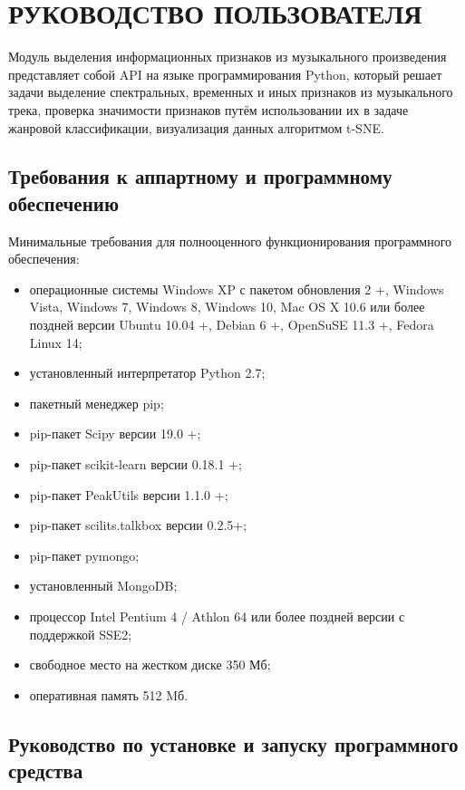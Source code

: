 \section{РУКОВОДСТВО ПОЛЬЗОВАТЕЛЯ}
\label{sec:manual}

Модуль выделения информационных признаков из музыкального произведения представляет собой API на языке программирования Python, который решает задачи выделение спектральных, временных и иных признаков из музыкального трека, проверка значимости признаков путём использовании их в задаче жанровой классификации, визуализация данных алгоритмом t-SNE.


\subsection{Требования к аппартному и программному обеспечению}
\label{sub:manual:sys}

Минимальные требования для полнооценного функционирования программного обеспечения:

\begin{itemize}
\item операционные системы Windows XP с пакетом обновления 2 +, Windows Vista, Windows 7, Windows 8, Windows 10, Mac OS X 10.6 или более поздней версии Ubuntu 10.04 +, Debian 6 +, OpenSuSE 11.3 +, Fedora Linux 14;
\item установленный интерпретатор Python 2.7;
\item пакетный менеджер pip;
\item pip-пакет Scipy версии 19.0 +;
\item pip-пакет scikit-learn версии 0.18.1 +; 
\item pip-пакет PeakUtils  версии 1.1.0 +;
\item pip-пакет scilits.talkbox версии 0.2.5+;
\item pip-пакет pymongo;
\item установленный MongoDB;
\item процессор Intel Pentium 4 / Athlon 64 или более поздней версии с поддержкой SSE2;
\item свободное место на жестком диске 350 Мб;
\item оперативная память 512 Mб.
\end{itemize}


\subsection{Руководство по установке и запуску программного средства}
\label{sub:manual:install}

